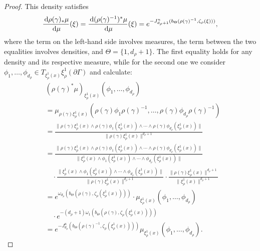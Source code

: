 \documentclass{report}
\begin{document}
\begin{proof}
    This density satisfies
    \[
        \frac{\,\mathrm{d} \rho(\gamma)_*\mu}{\,\mathrm{d}\mu}(\xi) = \frac{\,\mathrm{d} (\rho(\gamma)^{-1})^*\mu}{\,\mathrm{d}\mu}(\xi) =
        e^{-J^u_{d_\rho + 1}(b_\Theta(\rho(\gamma)^{-1}, \zeta_\rho(\xi)))},
    \]
    where the term on the left-hand side involves measures, the term between the two equalities involves densities, and $\Theta = \{1, d_\rho + 1\}$.
    The first equality holds for any density and its respective measure, while for the second one we consider $\phi_1, \ldots, \phi_{d_\rho} \in T_{\xi_\rho^1(x)}\xi_\rho^1(\partial \Gamma)$ and calculate:
    \begin{align*}
        &(\rho(\gamma)^*\mu)_{\xi_\rho^1(x)} (\phi_1, \ldots, \phi_{d_\rho})\\
        &=
        \mu_{\rho(\gamma)\xi_\rho^1(x)} (\rho(\gamma)\phi_1\rho(\gamma)^{-1}, \ldots, \rho(\gamma)\phi_{d_\rho} \rho(\gamma)^{-1}) \\
        &=
        \frac{\|\rho(\gamma) \xi_\rho^1(x) \wedge \rho(\gamma) \phi_1(\xi_\rho^1(x)) \wedge \cdots \wedge \rho(\gamma) \phi_{d_\rho}(\xi_\rho^1(x))\|}
        {\| \rho(\gamma) \xi_\rho^1(x) \|^{d_\rho + 1}} \\
        &=
        \frac{\|\rho(\gamma) \xi_\rho^1(x) \wedge \rho(\gamma) \phi_1(\xi_\rho^1(x)) \wedge \cdots \wedge \rho(\gamma) \phi_{d_\rho}(\xi_\rho^1(x))\|}
        {\|\xi_\rho^1(x) \wedge \phi_1(\xi_\rho^1(x)) \wedge \cdots \wedge \phi_{d_\rho}(\xi_\rho^1(x))\|} \\
        &\quad \cdot
        \frac{\|\xi_\rho^1(x) \wedge \phi_1(\xi_\rho^1(x)) \wedge \cdots \wedge \phi_{d_\rho}(\xi_\rho^1(x))\|}
        {\|\rho(\gamma) \xi_\rho^1(x)\|^{d_\rho+1}}\cdot
        \frac{\| \rho(\gamma)\xi_\rho^1(x)\|^{d_\rho+1}}{\|\xi_\rho^1(x)\|^{d_\rho+1}} \\
         &=
         e^{\omega_{d_\rho}(b_\Theta(\rho(\gamma), \zeta_\rho(\xi_\rho^1(x))))} \cdot
         \mu_{\xi_\rho^1(x)}(\phi_1, \ldots, \phi_{d_\rho}) \\
         &\quad \cdot
         e^{-(d_\rho+1)\omega_1(b_\Theta(\rho(\gamma), \zeta_\rho(\xi_\rho^1(x))))} \\
         &=
         e^{-J_{d_\rho}^u(b_\Theta(\rho(\gamma)^{-1}, \zeta_\rho(\xi_\rho^1(x))))} \mu_{\xi_\rho^1(x)}(\phi_1, \ldots, \phi_{d_\rho}).
    \end{align*}
    

\end{proof}
\end{document}
